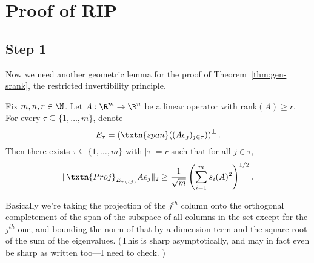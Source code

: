 
\section{Proof of RIP}
\subsection{Step 1}
Now we need another geometric lemma for the proof of %
Theorem~\ref{thm:gen-srank}, the restricted invertibility principle. 

\begin{lem}[Step 1] 
Fix $m, n, r \in \N$. Let $A: \R^m \to \R^n$ be a linear operator with rank$(A) \geq r$. For every $\tau \subseteq \{1, \ldots, m\}$, denote
\[
E_{\tau} = \left(\txtn{span}((Ae_j)_{j \in \tau})\right)^{\perp}.
\] 
Then there exists $\tau \subseteq \{1, \ldots, m\}$ with $|\tau| = r$ such that for all $j \in \tau$, 
\[
\|\txtn{Proj}_{E_{\tau \setminus \{j\}}} Ae_j\|_2 \geq \frac{1}{\sqrt{m}}\left(\sum_{i = 1}^m s_i(A)^2\right)^{1/2}.
\]
\end{lem}
Basically we're taking the projection of the $j^{th}$ column onto the orthogonal completement of the span of the subspace of all columns in the set except for the $j^{th}$ one, and bounding the norm of that by a dimension term and the square root of the sum of the eigenvalues. 
(This is sharp asymptotically, and may in fact even be sharp as written too---I need to check. )

